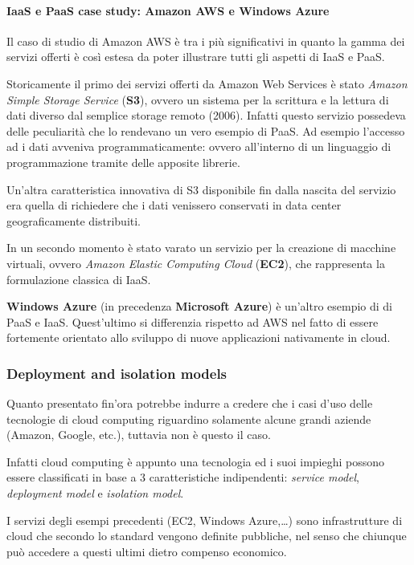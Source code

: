 \documentclass[italian,]{article}
\let\oldparagraph\paragraph
\renewcommand{\paragraph}[1]{\oldparagraph{#1}\mbox{}}
\begin{document}
\paragraph{IaaS e PaaS case study: Amazon AWS e Windows
Azure}\label{iaas-e-paas-case-study-amazon-aws-e-windows-azure}

Il caso di studio di Amazon AWS è tra i più significativi in quanto la
gamma dei servizi offerti è così estesa da poter illustrare tutti gli
aspetti di IaaS e PaaS.

Storicamente il primo dei servizi offerti da Amazon Web Services è stato
\emph{Amazon Simple Storage Service} (\textbf{S3}), ovvero un sistema
per la scrittura e la lettura di dati diverso dal semplice storage
remoto (2006). Infatti questo servizio possedeva delle peculiarità che
lo rendevano un vero esempio di PaaS. Ad esempio l'accesso ad i dati
avveniva programmaticamente: ovvero all'interno di un linguaggio di
programmazione tramite delle apposite librerie.

Un'altra caratteristica innovativa di S3 disponibile fin dalla nascita
del servizio era quella di richiedere che i dati venissero conservati in
data center geograficamente distribuiti.

In un secondo momento è stato varato un servizio per la creazione di
macchine virtuali, ovvero \emph{Amazon Elastic Computing Cloud}
(\textbf{EC2}), che rappresenta la formulazione classica di IaaS.

\textbf{Windows Azure} (in precedenza \textbf{Microsoft Azure}) è
un'altro esempio di di PaaS e IaaS. Quest'ultimo si differenzia rispetto
ad AWS nel fatto di essere fortemente orientato allo sviluppo di nuove
applicazioni nativamente in cloud.

\subsubsection{Deployment and isolation
models}\label{deployment-and-isolation-models}

Quanto presentato fin'ora potrebbe indurre a credere che i casi d'uso
delle tecnologie di cloud computing riguardino solamente alcune grandi
aziende (Amazon, Google, etc.), tuttavia non è questo il caso.

Infatti cloud computing è appunto una tecnologia ed i suoi impieghi
possono essere classificati in base a 3 caratteristiche indipendenti:
\emph{service model}, \emph{deployment model} e \emph{isolation model}.

I servizi degli esempi precedenti (EC2, Windows Azure,\ldots{}) sono
infrastrutture di cloud che secondo lo standard vengono definite
pubbliche, nel senso che chiunque può accedere a questi ultimi dietro
compenso economico.
\end{document}
